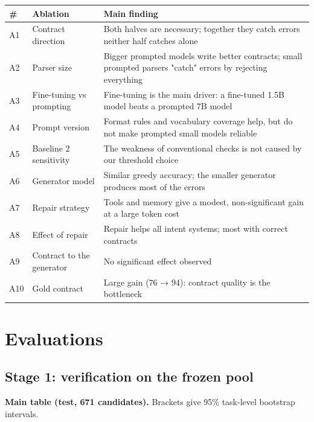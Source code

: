 \documentclass[11pt]{article}
\begin{document}
\begin{table}[!tp]
\centering\footnotesize\setlength{\tabcolsep}{3pt}\renewcommand{\arraystretch}{1.1}
\begin{tabularx}{\textwidth}{ll>{\raggedright\arraybackslash}X}
\toprule
\textbf{\#} & \textbf{Ablation} & \textbf{Main finding} \\
\midrule
A1 & Contract direction & Both halves are necessary; together they catch errors neither half catches alone \\
A2 & Parser size & Bigger prompted models write better contracts; small prompted parsers "catch" errors by rejecting everything \\
A3 & Fine-tuning vs prompting & Fine-tuning is the main driver: a fine-tuned 1.5B model beats a prompted 7B model \\
A4 & Prompt version & Format rules and vocabulary coverage help, but do not make prompted small models reliable \\
A5 & Baseline 2 sensitivity & The weakness of conventional checks is not caused by our threshold choice \\
A6 & Generator model & Similar greedy accuracy; the smaller generator produces most of the errors \\
A7 & Repair strategy & Tools and memory give a modest, non-significant gain at a large token cost \\
A8 & Effect of repair & Repair helps all intent systems; most with correct contracts \\
A9 & Contract to the generator & No significant effect observed \\
A10 & Gold contract & Large gain (76 → 94): contract quality is the bottleneck \\
\bottomrule
\end{tabularx}
\end{table}

\section{Evaluations}

\subsection{Stage 1: verification on the frozen pool}

\textbf{Main table (test, 671 candidates).} Brackets give 95\%
task-level bootstrap intervals.
\end{document}
